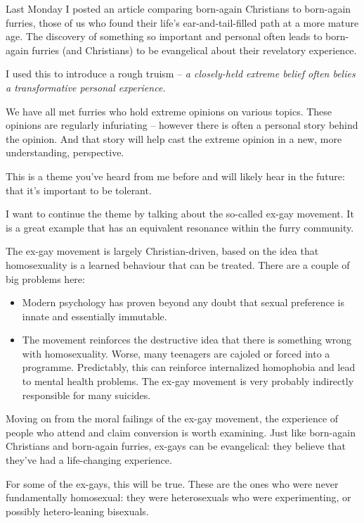 
Last Monday I posted an article comparing born-again Christians to born-again furries, those of us who found their life's ear-and-tail-filled path at a more mature age. The discovery of something so important and personal often leads to born-again furries (and Christians) to be evangelical about their revelatory experience.

I used this to introduce a rough truism -- \textit{a closely-held extreme belief often belies a transformative personal experience.}

We have all met furries who hold extreme opinions on various topics. These opinions are regularly infuriating -- however there is often a personal story behind the opinion. And that story will help cast the extreme opinion in a new, more understanding, perspective.

This is a theme you've heard from me before and will likely hear in the future: that it's important to be tolerant.

I want to continue the theme by talking about the so-called ex-gay movement. It is a great example that has an equivalent resonance within the furry community.

The ex-gay movement is largely Christian-driven, based on the idea that homosexuality is a learned behaviour that can be treated. There are a couple of big problems here:

\begin{itemize}
  \item Modern psychology has proven beyond any doubt that sexual preference is innate and essentially immutable.
  \item The movement reinforces the destructive idea that there is something wrong with homosexuality. Worse, many teenagers are cajoled or forced into a programme. Predictably, this can reinforce internalized homophobia and lead to mental health problems. The ex-gay movement is very probably indirectly responsible for many suicides.
\end{itemize}

Moving on from the moral failings of the ex-gay movement, the experience of people who attend and claim conversion is worth examining. Just like born-again Christians and born-again furries, ex-gays can be evangelical: they believe that they've had a life-changing experience.

For some of the ex-gays, this will be true. These are the ones who were never fundamentally homosexual: they were heterosexuals who were experimenting, or possibly hetero-leaning bisexuals.

